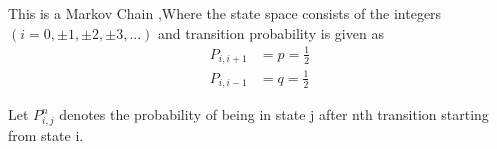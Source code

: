 This is a Markov Chain ,Where the state space consists of the integers $(i=0,\pm1,\pm2,\pm3,...)$ and transition  probability is given as
\begin{align}
   P_{i,i+1} &= p =\frac{1}{2}
   \\
   P_{i,i-1} & =q =\frac{1}{2}
\end{align}
Let $P_{i,j}^{n}$ denotes the probability of being in state j after nth transition starting from state i.
